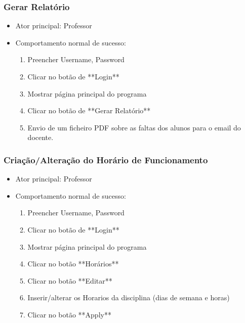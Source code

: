 \documentclass[11pt]{article}   %
\begin{document}
\subsubsection{Gerar Relatório} 

\begin{itemize}

    \item Ator principal: Professor
    \item Comportamento normal de sucesso:
    \begin{enumerate}
  
        \item  Preencher Username, Password
        \item Clicar no botão de **Login**
        \item Mostrar página principal do programa
        \item Clicar no botão de **Gerar Relatório**
        \item Envio de um ficheiro PDF sobre as faltas dos alunos para o email do docente.

    \end{enumerate} 

\end{itemize}

\subsubsection{Criação/Alteração do Horário de Funcionamento} 

\begin{itemize}
    \item Ator principal: Professor
    \item Comportamento normal de sucesso:
    \begin{enumerate}
  
        \item Preencher Username, Password
        \item Clicar no botão de **Login**
        \item Mostrar página principal do programa
        \item Clicar no botão **Horários**
        \item Clicar no botão **Editar**
        \item Inserir/alterar os Horarios da disciplina (dias de semana e horas)
        \item Clicar no botão **Apply**
    \end{enumerate} 
\end{itemize}
  
\end{document}
